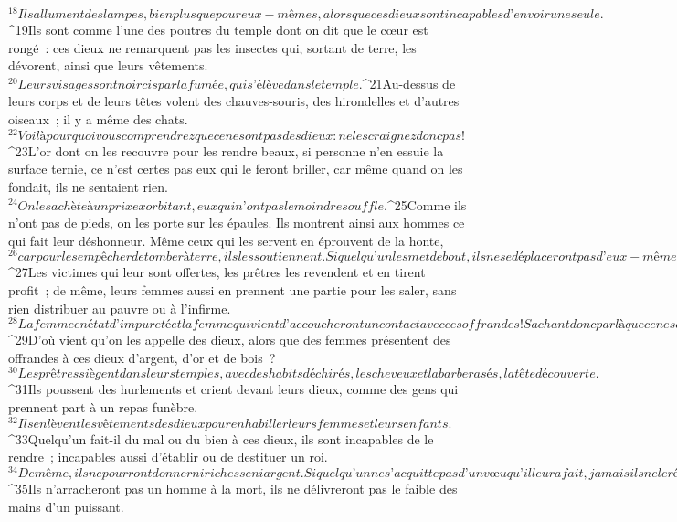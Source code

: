 ${}^{18}Ils allument des lampes, bien plus que pour eux-mêmes, alors que ces dieux sont incapables d’en voir une seule. 
${}^{19}Ils sont comme l’une des poutres du temple dont on dit que le cœur est rongé : ces dieux ne remarquent pas les insectes qui, sortant de terre, les dévorent, ainsi que leurs vêtements. 
${}^{20}Leurs visages sont noircis par la fumée, qui s’élève dans le temple. 
${}^{21}Au-dessus de leurs corps et de leurs têtes volent des chauves-souris, des hirondelles et d’autres oiseaux ; il y a même des chats. 
${}^{22}Voilà pourquoi vous comprendrez que ce ne sont pas des dieux : ne les craignez donc pas !
${}^{23}L’or dont on les recouvre pour les rendre beaux, si personne n’en essuie la surface ternie, ce n’est certes pas eux qui le feront briller, car même quand on les fondait, ils ne sentaient rien. 
${}^{24}On les achète à un prix exorbitant, eux qui n’ont pas le moindre souffle. 
${}^{25}Comme ils n’ont pas de pieds, on les porte sur les épaules. Ils montrent ainsi aux hommes ce qui fait leur déshonneur. Même ceux qui les servent en éprouvent de la honte, 
${}^{26}car pour les empêcher de tomber à terre, ils les soutiennent. Si quelqu’un les met debout, ils ne se déplaceront pas d’eux-mêmes ; s’ils penchent, ils ne peuvent pas davantage se redresser. Mais c’est comme à des morts qu’on leur présente des offrandes. 
${}^{27}Les victimes qui leur sont offertes, les prêtres les revendent et en tirent profit ; de même, leurs femmes aussi en prennent une partie pour les saler, sans rien distribuer au pauvre ou à l’infirme. 
${}^{28}La femme en état d’impureté et la femme qui vient d’accoucher ont un contact avec ces offrandes ! Sachant donc par là que ce ne sont pas des dieux, ne les craignez pas !
${}^{29}D’où vient qu’on les appelle des dieux, alors que des femmes présentent des offrandes à ces dieux d’argent, d’or et de bois ? 
${}^{30}Les prêtres siègent dans leurs temples, avec des habits déchirés, les cheveux et la barbe rasés, la tête découverte. 
${}^{31}Ils poussent des hurlements et crient devant leurs dieux, comme des gens qui prennent part à un repas funèbre. 
${}^{32}Ils enlèvent les vêtements des dieux pour en habiller leurs femmes et leurs enfants. 
${}^{33}Quelqu’un fait-il du mal ou du bien à ces dieux, ils sont incapables de le rendre ; incapables aussi d’établir ou de destituer un roi. 
${}^{34}De même, ils ne pourront donner ni richesse ni argent. Si quelqu’un ne s’acquitte pas d’un vœu qu’il leur a fait, jamais ils ne le réclameront. 
${}^{35}Ils n’arracheront pas un homme à la mort, ils ne délivreront pas le faible des mains d’un puissant. 
